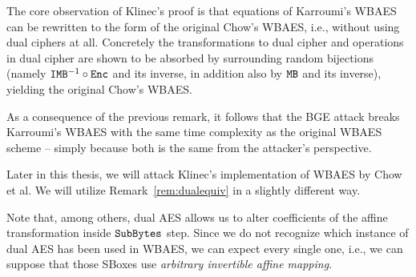 	\begin{remark}
	\label{rem:dualequiv}
		The core observation of Klinec's proof is that equations of Karroumi's WBAES can be rewritten to the form of the original Chow's WBAES, i.e., without using dual ciphers at all. Concretely the transformations to dual cipher and operations in dual cipher are shown to be absorbed by surrounding random bijections (namely $\texttt{IMB}^{-1}\circ\texttt{Enc}$ and its inverse, in addition also by $\texttt{MB}$ and its inverse), yielding the original Chow's WBAES.
	\end{remark}
	
	As a consequence of the previous remark, it follows that the BGE attack breaks Karroumi's WBAES with the same time complexity as the original WBAES scheme -- simply because both is the same from the attacker's perspective.
	
	\begin{note}
	\label{note:dualsbox}
		Later in this thesis, we will attack Klinec's implementation \cite{klinec2013implementation} of WBAES by Chow et al. We will utilize Remark~\ref{rem:dualequiv} in a slightly different way.
		
		Note that, among others, dual AES allows us to alter coefficients of the affine transformation inside $\texttt{SubBytes}$ step. Since we do not recognize which instance of dual AES has been used in WBAES, we can expect every single one, i.e., we can suppose that those SBoxes use {\em arbitrary invertible affine mapping}.
	\end{note}
	
